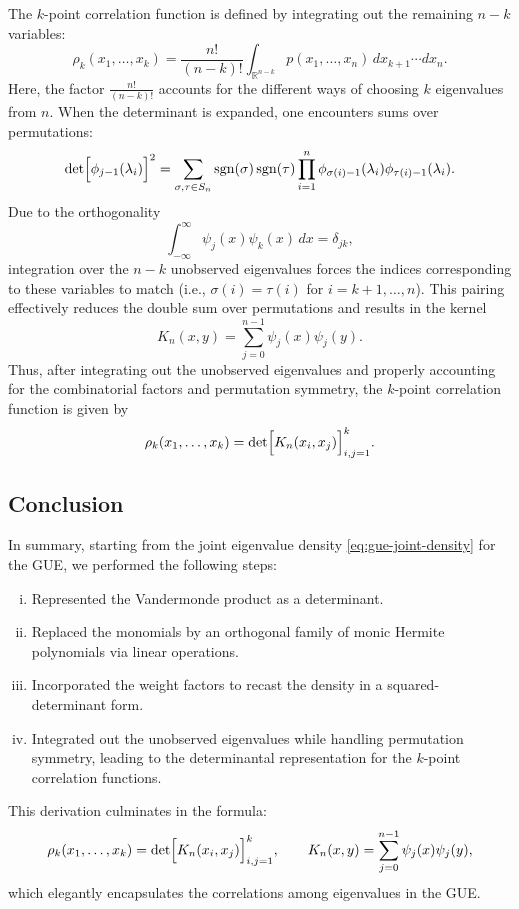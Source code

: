 \documentclass[letterpaper,11pt,oneside,reqno]{article}
\numberwithin{equation}{section}
\theoremstyle{definition}
\begin{document}
The $k$-point correlation function is defined by integrating out the remaining $n-k$ variables:
\[
\rho_k(x_1,\dots,x_k)=\frac{n!}{(n-k)!}\int_{\mathbb{R}^{n-k}} p(x_1,\dots,x_n) \,dx_{k+1}\cdots dx_n.
\]
Here, the factor $\frac{n!}{(n-k)!}$ accounts for the different ways of choosing $k$ eigenvalues from $n$. When the determinant is expanded, one encounters sums over permutations:
\[
\det\Bigl[\phi_{j-1}(\lambda_i)\Bigr]^2 = \sum_{\sigma,\tau\in S_n} \operatorname{sgn}(\sigma)\operatorname{sgn}(\tau) \prod_{i=1}^n \phi_{\sigma(i)-1}(\lambda_i)\phi_{\tau(i)-1}(\lambda_i).
\]
Due to the orthogonality
\[
\int_{-\infty}^{\infty}\psi_j(x)\psi_k(x)\,dx=\delta_{jk},
\]
integration over the $n-k$ unobserved eigenvalues forces the indices corresponding to these variables to match (i.e., $\sigma(i)=\tau(i)$ for $i=k+1,\dots,n$). This pairing effectively reduces the double sum over permutations and results in the kernel
\[
K_n(x,y)=\sum_{j=0}^{n-1}\psi_j(x)\psi_j(y).
\]
Thus, after integrating out the unobserved eigenvalues and properly accounting for the combinatorial factors and permutation symmetry, the $k$-point correlation function is given by
\[
\rho_k(x_1,\dots,x_k)=\det\Bigl[K_n(x_i,x_j)\Bigr]_{i,j=1}^k.
\]

\subsection*{Conclusion}

In summary, starting from the joint eigenvalue density \eqref{eq:gue-joint-density} for the GUE, we performed the following steps:
\begin{enumerate}[(i)]
    \item Represented the Vandermonde product as a determinant.
    \item Replaced the monomials by an orthogonal family of monic Hermite polynomials via linear operations.
    \item Incorporated the weight factors to recast the density in a squared-determinant form.
    \item Integrated out the unobserved eigenvalues while handling permutation symmetry, leading to the determinantal representation for the $k$-point correlation functions.
\end{enumerate}
This derivation culminates in the formula:
\[
\rho_k(x_1,\dots,x_k)=\det\Bigl[K_n(x_i,x_j)\Bigr]_{i,j=1}^k,\qquad K_n(x,y)=\sum_{j=0}^{n-1}\psi_j(x)\psi_j(y),
\]
which elegantly encapsulates the correlations among eigenvalues in the GUE.
\end{document}
